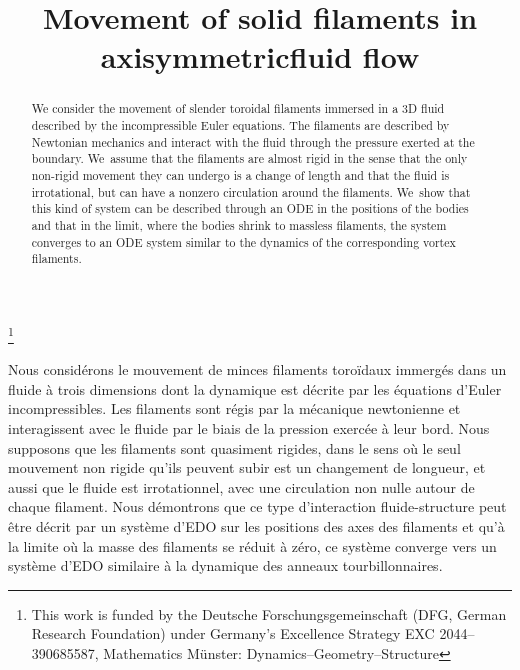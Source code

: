 \documentclass[JEP,XML,SOM,Unicode,published]{cedram}
\theoremstyle{definition}
\begin{document}
\frontmatter
\title{Movement of solid filaments in axisymmetric\nobreakspace fluid flow}

\author[\initial{D.} \lastname{Meyer}]{ }
\address{Instituto de Ciencias Matemáticas,\\
Calle Nicolás Cabrera 13-15, 28049 Madrid, Spain}

\thanks{This work is funded by the Deutsche Forschungsgemeinschaft (DFG, German Research Foundation) under Germany’s Excellence Strategy EXC 2044–390685587, Mathematics Münster: Dynamics–Geometry–Structure}

\begin{abstract}
We consider the movement of slender toroidal filaments immersed in a 3D fluid described by the incompressible Euler equations. The filaments are described by Newtonian mechanics and interact with the fluid through the pressure exerted at the boundary. We~assume that the filaments are almost rigid in the sense that the only non-rigid movement they can undergo is a change of length and that the fluid is irrotational, but can have a nonzero circulation around the filaments. We~show that this kind of system can be described through an ODE in the positions of the bodies and that in the limit, where the bodies shrink to massless filaments, the system converges to an ODE system similar to the dynamics of the corresponding vortex filaments.
\end{abstract}





\begin{altabstract}
Nous considérons le mouvement de minces filaments toroïdaux immergés dans un fluide à trois dimensions dont la dynamique est décrite par les équations d'Euler incompressibles. Les filaments sont régis par la mécanique newtonienne et interagissent avec le fluide par le biais de la pression exercée à leur bord. Nous supposons que les filaments sont quasiment rigides, dans le sens où le seul mouvement non rigide qu'ils peuvent subir est un changement de longueur, et aussi que le fluide est irrotationnel, avec une circulation non nulle autour de chaque filament. Nous démontrons que ce type d'interaction fluide-structure peut être décrit par un système d'EDO sur les positions des axes des filaments et qu'à la limite où la masse des filaments se réduit à zéro, ce système converge vers un système d'EDO similaire à la dynamique des anneaux tourbillonnaires.
\end{altabstract}
\end{document}

